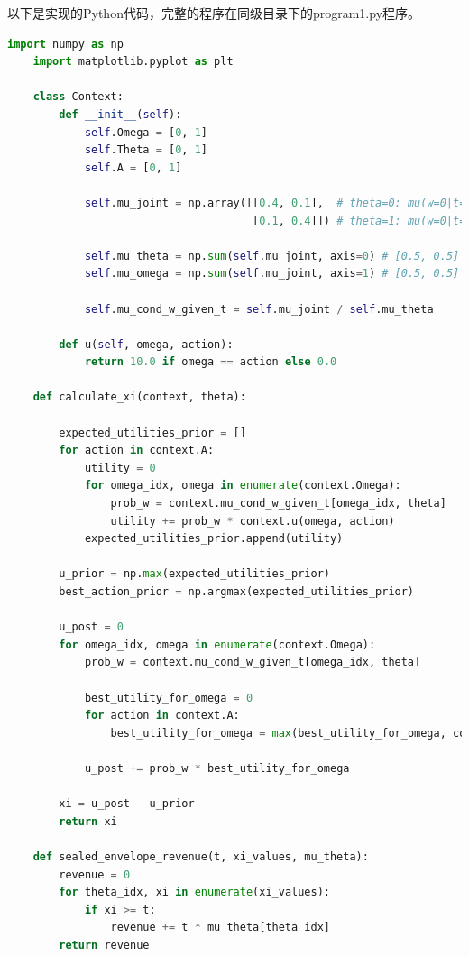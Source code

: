 以下是实现的Python代码，完整的程序在同级目录下的program1.py程序。

\begin{lstlisting}[language=Python,style=pythonstyle]
    import numpy as np
    import matplotlib.pyplot as plt
    
    class Context:
        def __init__(self):
            self.Omega = [0, 1]
            self.Theta = [0, 1]
            self.A = [0, 1]
            
            self.mu_joint = np.array([[0.4, 0.1],  # theta=0: mu(w=0|t=0)=0.4, mu(w=1|t=0)=0.1
                                      [0.1, 0.4]]) # theta=1: mu(w=0|t=1)=0.1, mu(w=1|t=1)=0.4
            
            self.mu_theta = np.sum(self.mu_joint, axis=0) # [0.5, 0.5]
            self.mu_omega = np.sum(self.mu_joint, axis=1) # [0.5, 0.5]
            
            self.mu_cond_w_given_t = self.mu_joint / self.mu_theta
            
        def u(self, omega, action):
            return 10.0 if omega == action else 0.0
    
    def calculate_xi(context, theta):
        
        expected_utilities_prior = []
        for action in context.A:
            utility = 0
            for omega_idx, omega in enumerate(context.Omega):
                prob_w = context.mu_cond_w_given_t[omega_idx, theta]
                utility += prob_w * context.u(omega, action)
            expected_utilities_prior.append(utility)
        
        u_prior = np.max(expected_utilities_prior)
        best_action_prior = np.argmax(expected_utilities_prior)
    
        u_post = 0
        for omega_idx, omega in enumerate(context.Omega):
            prob_w = context.mu_cond_w_given_t[omega_idx, theta]
            
            best_utility_for_omega = 0
            for action in context.A:
                best_utility_for_omega = max(best_utility_for_omega, context.u(omega, action))
            
            u_post += prob_w * best_utility_for_omega
    
        xi = u_post - u_prior
        return xi
    
    def sealed_envelope_revenue(t, xi_values, mu_theta):
        revenue = 0
        for theta_idx, xi in enumerate(xi_values):
            if xi >= t:
                revenue += t * mu_theta[theta_idx]
        return revenue
    

\end{lstlisting}
